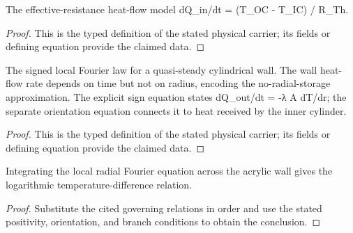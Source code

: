 \begin{definition}
  \label{def:physics:IPhO_2026_4_C_7:aux019}
  The effective-resistance heat-flow model dQ\_in/dt = (T\_OC - T\_IC) / R\_Th.
\end{definition}
\begin{proof}
  This is the typed definition of the stated physical carrier; its fields or defining equation provide the claimed data.
\end{proof}

\begin{definition}
  \label{def:physics:IPhO_2026_4_C_7:aux020}
  The signed local Fourier law for a quasi-steady cylindrical wall. The wall heat-flow rate depends on time but not on radius, encoding the no-radial-storage approximation. The explicit sign equation states dQ\_out/dt = -λ A dT/dr; the separate orientation equation connects it to heat received by the inner cylinder.
\end{definition}
\begin{proof}
  This is the typed definition of the stated physical carrier; its fields or defining equation provide the claimed data.
\end{proof}

\begin{lemma}
  \label{lem:physics:IPhO_2026_4_C_7:aux021}
  Integrating the local radial Fourier equation across the acrylic wall gives the logarithmic temperature-difference relation.
\end{lemma}
\begin{proof}
  Substitute the cited governing relations in order and use the stated positivity, orientation, and branch conditions to obtain the conclusion.
\end{proof}

